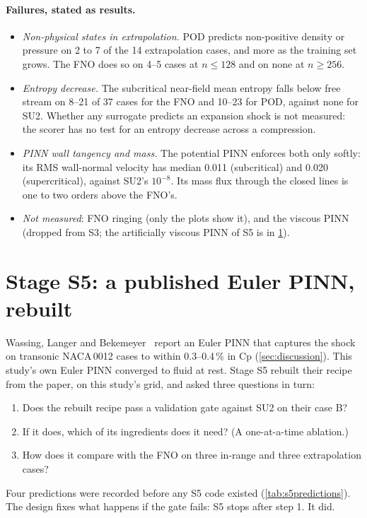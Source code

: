 \documentclass[11pt]{article}
\begin{document}
\paragraph{Failures, stated as results.}
\begin{itemize}
  \item \emph{Non-physical states in extrapolation.} POD predicts non-positive density or pressure
    on 2 to 7 of the 14 extrapolation cases, and more as the training set grows. The FNO does so on
    4--5 cases at $n\le128$ and on none at $n\ge256$.
  \item \emph{Entropy decrease.} The subcritical near-field mean entropy falls below free stream on
    8--21 of 37 cases for the FNO and 10--23 for POD, against none for SU2. Whether any surrogate
    predicts an expansion shock is not measured: the scorer has no test for an entropy decrease
    across a compression.
  \item \emph{PINN wall tangency and mass.} The potential PINN enforces both only softly: its RMS
    wall-normal velocity has median 0.011 (subcritical) and 0.020 (supercritical), against SU2's
    $10^{-8}$. Its mass flux through the closed lines is one to two orders above the FNO's.
  \item \emph{Not measured}: FNO ringing (only the plots show it), and the viscous PINN (dropped
    from S3; the artificially viscous PINN of S5 is in \cref{sec:s5}).
\end{itemize}

\clearpage
\section{Stage S5: a published Euler PINN, rebuilt}
\label{sec:s5}

Wassing, Langer and Bekemeyer~\cite{wassing2025} report an Euler PINN that captures the shock on
transonic NACA\,0012 cases to within 0.3--0.4\,\% in Cp (\cref{sec:discussion}). This study's own
Euler PINN converged to fluid at rest. Stage S5 rebuilt their recipe from the paper, on this
study's grid, and asked three questions in turn:
\begin{enumerate}
  \item Does the rebuilt recipe pass a validation gate against SU2 on their case B?
  \item If it does, which of its ingredients does it need? (A one-at-a-time ablation.)
  \item How does it compare with the FNO on three in-range and three extrapolation cases?
\end{enumerate}
Four predictions were recorded before any S5 code existed (\cref{tab:s5predictions}). The design
fixes what happens if the gate fails: S5 stops after step 1. It did.
\end{document}
